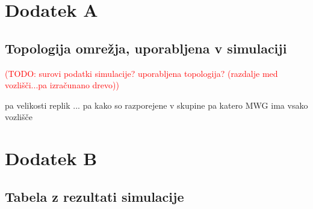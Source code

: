 \documentclass[a4paper, 12pt]{book}
\newcommand{\TODO}[1]{\textcolor{red}{(TODO: #1)}}
\begin{document}
\chapter*{Dodatek A}
\section*{Topologija omrežja, uporabljena v simulaciji}

\TODO{surovi podatki simulacije? uporabljena topologija? (razdalje
med vozlišči...pa izračunano drevo)}

pa velikosti replik ...
pa kako so razporejene v skupine
pa katero MWG ima vsako vozlišče

\chapter*{Dodatek B}
\section*{Tabela z rezultati simulacije}
\end{document}
